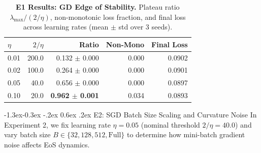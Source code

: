 \documentclass[10pt,twocolumn]{article}
\makeatletter
\renewcommand\subsection{\@startsection{subsection}{2}{\z@}%
                                     {-1.3ex\@plus -0.3ex \@minus -.2ex}%
                                     {0.6ex \@plus .2ex}%
                                     {\normalfont\normalsize\bfseries}}
\makeatother
\begin{document}
\begin{table}[t]
\centering
\small
\setlength{\tabcolsep}{3pt}
\caption{\textbf{E1 Results: GD Edge of Stability.} Plateau ratio $\lambda_{\max}/(2/\eta)$, non-monotonic loss fraction, and final loss across learning rates (mean $\pm$ std over 3 seeds).}
\label{tab:e1_results}
\begin{tabular}{lrrrr}
\toprule
$\eta$ & $2/\eta$ & Ratio & Non-Mono & Final Loss \\
\midrule
0.01 & 200.0 & 0.132 $\pm$ 0.000 & 0.000 & 0.0902 \\
0.02 & 100.0 & 0.264 $\pm$ 0.000 & 0.000 & 0.0901 \\
0.05 & 40.0 & 0.656 $\pm$ 0.000 & 0.000 & 0.0897 \\
0.10 & 20.0 & \textbf{0.962 $\pm$ 0.001} & 0.034 & 0.0893 \\
\bottomrule
\end{tabular}
\end{table}

\subsection{E2: SGD Batch Size Scaling and Curvature Noise}
In Experiment 2, we fix learning rate $\eta = 0.05$ (nominal threshold $2/\eta = 40.0$) and vary batch size $B \in \{32, 128, 512, \text{Full}\}$ to determine how mini-batch gradient noise affects EoS dynamics.
\end{document}
